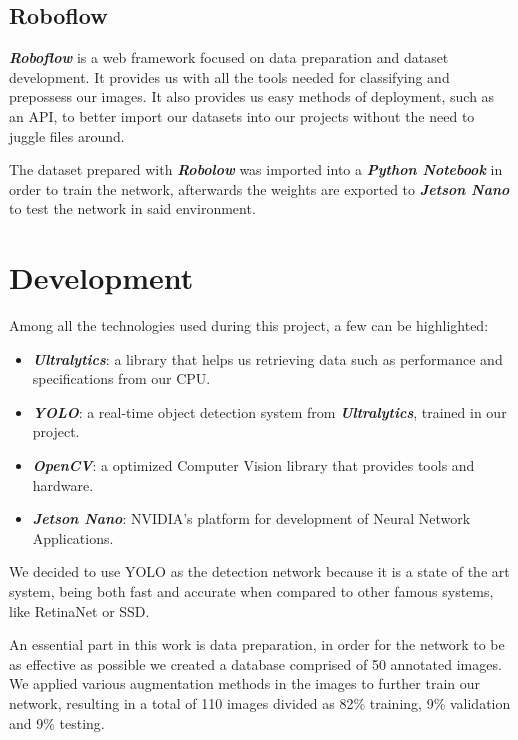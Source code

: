 \documentclass[conference]{IEEEtran}
\begin{document}
\subsection{Roboflow}

\textit{\textbf{Roboflow}} is a web framework focused on data preparation and dataset development. It provides us with all the tools needed for classifying and prepossess our images. It also provides us easy methods of deployment, such as an API, to better import our datasets into our projects without the need to juggle files around.

The dataset prepared with \textit{\textbf{Robolow}} was imported into a \textit{\textbf{Python Notebook}} in order to train the network, afterwards the weights are exported to \textit{\textbf{Jetson Nano}} to test the network in said environment.

\section{Development}

Among all the technologies used during this project, a few can be highlighted:

\begin{itemize}
    \item \textit{\textbf{Ultralytics}}: a library that helps us retrieving data such as performance and specifications from our CPU.
    \item \textit{\textbf{YOLO}}: a real-time object detection system from \textit{\textbf{Ultralytics}}, trained in our project.
    \item \textit{\textbf{OpenCV}}: a optimized Computer Vision library that provides tools and hardware.
    \item \textit{\textbf{Jetson Nano}}: NVIDIA's platform for development of Neural Network Applications.
\end{itemize}

We decided to use YOLO as the detection network because it is a state of the art system, being both fast and accurate when compared to other famous systems, like RetinaNet or SSD.

An essential part in this work is data preparation, in order for the network to be as effective as possible we created a database comprised of 50 annotated images. We applied various augmentation methods in the images to further train our network, resulting in a total of 110 images divided as 82\% training, 9\% validation and 9\% testing.
\end{document}
